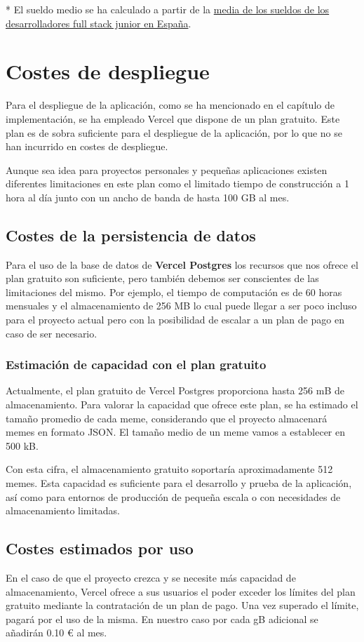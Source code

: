 * El sueldo medio se ha calculado a partir de la \href{https://www.glassdoor.es/Sueldos/desarrollador-full-stack-junior-sueldo-SRCH_KO0,31.htm}{media de los sueldos de los desarrolladores full stack junior en España}.

\section{Costes de despliegue}

Para el despliegue de la aplicación, como se ha mencionado en el capítulo de implementación, se ha empleado Vercel que dispone de un plan gratuito. Este plan es de sobra suficiente para el despliegue de la aplicación, por lo que no se han incurrido en costes de despliegue.

Aunque sea idea para proyectos personales y pequeñas aplicaciones existen diferentes limitaciones en este plan como el limitado tiempo de construcción a 1 hora al día junto con un ancho de banda de hasta 100 GB al mes.

\subsection{Costes de la persistencia de datos}

Para el uso de la base de datos de \textbf{Vercel Postgres} los recursos que nos ofrece el plan gratuito son suficiente, pero también debemos ser conscientes de las limitaciones del mismo. Por ejemplo, el tiempo de computación es de 60 horas mensuales y el almacenamiento de 256 MB lo cual puede llegar a ser poco incluso para el proyecto actual pero con la posibilidad de escalar a un plan de pago en caso de ser necesario.

\subsubsection{Estimación de capacidad con el plan gratuito}

Actualmente, el plan gratuito de Vercel Postgres proporciona hasta 256 mB de almacenamiento. Para valorar la capacidad que ofrece este plan, se ha estimado el tamaño promedio de cada meme, considerando que el proyecto almacenará memes en formato JSON. El tamaño medio de un meme vamos a establecer en 500 kB.

Con esta cifra, el almacenamiento gratuito soportaría aproximadamente 512 memes. Esta capacidad es suficiente para el desarrollo y prueba de la aplicación, así como para entornos de producción de pequeña escala o con necesidades de almacenamiento limitadas.

\subsection{Costes estimados por uso}

En el caso de que el proyecto crezca y se necesite más capacidad de almacenamiento, Vercel ofrece a sus usuarios el poder exceder los límites del plan gratuito mediante la contratación de un plan de pago. Una vez superado el límite, pagará por el uso de la misma. En nuestro caso por cada gB adicional se añadirán 0.10 € al mes.
